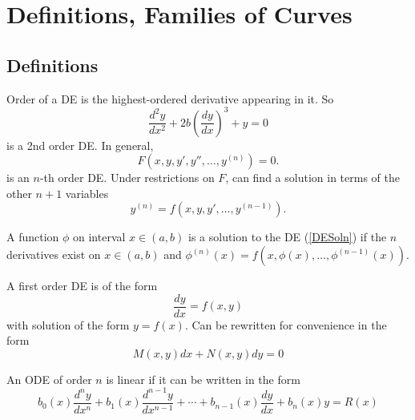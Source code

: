 \section{Definitions, Families of Curves}

\subsection{Definitions}

\begin{definition}[Order]
    Order of a DE is the highest-ordered derivative appearing in it.
    So
    \begin{equation}
        \frac{d^2y}{dx^2}+2b(\frac{dy}{dx})^3+y=0
    \end{equation}
    is a 2nd order DE. In general,
    \begin{equation}
        F(x,y,y',y'',\ldots,y^{(n)})=0.
    \end{equation}
    is an $n$-th order DE.
    Under restrictions on $F$, can find a solution in terms of the other $n+1$ variables
    \begin{equation}
        y^{(n)}=f(x,y,y',\ldots,y^{(n-1)}).\label{DESoln}
    \end{equation}
\end{definition}

\begin{definition}[Solution]
    A function $\phi$ on interval $x\in (a,b)$ is a solution to the DE (\ref{DESoln})
    if the $n$ derivatives exist on $x\in(a,b)$ and $\phi^{(n)}(x)=f(x,\phi(x),\ldots,\phi^{(n-1)}(x))$.
\end{definition}

\begin{definition}
    A first order DE is of the form
    \begin{equation}
        \frac{dy}{dx}=f(x,y)
    \end{equation}
    with solution of the form $y=f(x)$.
    Can be rewritten for convenience in the form
    \begin{equation}
        M(x,y)dx+N(x,y)dy=0
    \end{equation}
\end{definition}

\begin{definition}
    An ODE of order $n$ is linear if it can be written in the form
    \begin{equation}
        b_0(x)\frac{d^ny}{dx^n}+b_1(x)\frac{d^{n-1}y}{dx^{n-1}}+\cdots+b_{n-1}(x)\frac{dy}{dx}+b_{n}(x)y=R(x)
    \end{equation}
\end{definition}

